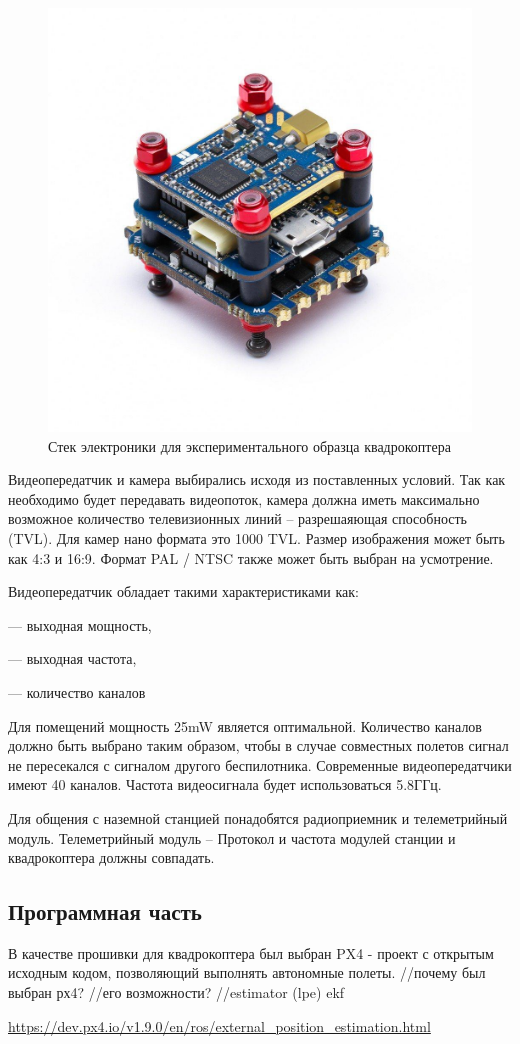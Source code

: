 \begin{figure}[H]
	\centering
	\includegraphics[width=0.5\linewidth]{pics/stack}
	\caption{Стек электроники для экспериментального образца квадрокоптера
	}
	\label{fig:stack} %
\end{figure}
Видеопередатчик и камера выбирались исходя из поставленных условий. Так как необходимо будет передавать видеопоток, камера должна иметь максимально возможное количество телевизионных линий -- разрешаяющая способность (TVL). Для камер нано формата это 1000 TVL. Размер изображения может быть как 4:3 и 16:9. Формат PAL / NTSC также может быть выбран на усмотрение.

Видеопередатчик обладает такими характеристиками как:

--- выходная мощность,

--- выходная частота,

--- количество каналов

Для помещений мощность 25mW является оптимальной. Количество каналов должно быть выбрано таким образом, чтобы в случае совместных полетов сигнал не пересекался с сигналом другого беспилотника. Современные видеопередатчики имеют 40 каналов. Частота видеосигнала будет использоваться 5.8ГГц.

Для общения с наземной станцией понадобятся радиоприемник и телеметрийный модуль. Телеметрийный модуль -- 
Протокол и частота модулей станции и квадрокоптера должны совпадать.%

\subsection{Программная часть}
В качестве прошивки для квадрокоптера был выбран PX4 - проект с открытым исходным кодом, позволяющий выполнять автономные полеты.
//почему был выбран рх4?
//его возможности?
//estimator (lpe) ekf

\url{https://dev.px4.io/v1.9.0/en/ros/external_position_estimation.html}
